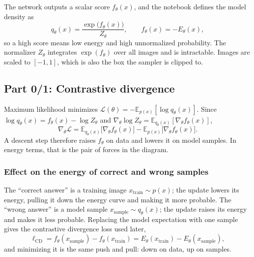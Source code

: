 The network outputs a scalar score \(f_\theta(x)\), and the notebook defines the model density as
\begin{equation}
  q_\theta(x) = \frac{\exp\bigl(f_\theta(x)\bigr)}{Z_\theta},
  \qquad
  f_\theta(x) = -E_\theta(x),
  \label{eq:ebm-q}
\end{equation}
so a high score means low energy and high unnormalized probability. The normalizer \(Z_\theta\) integrates \(\exp(f_\theta)\) over all images and is intractable. Images are scaled to \([-1,1]\), which is also the box the sampler is clipped to.

\subsection{Part 0/1: Contrastive divergence}

Maximum likelihood minimizes \(\mathcal{L}(\theta) = -\mathbb{E}_{p(x)}[\log q_\theta(x)]\). Since \(\log q_\theta(x) = f_\theta(x) - \log Z_\theta\) and \(\nabla_\theta \log Z_\theta = \mathbb{E}_{q_\theta(x)}[\nabla_\theta f_\theta(x)]\),
\begin{equation}
  \nabla_\theta \mathcal{L}
  = \mathbb{E}_{q_\theta(x)}\bigl[\nabla_\theta f_\theta(x)\bigr]
  - \mathbb{E}_{p(x)}\bigl[\nabla_\theta f_\theta(x)\bigr].
  \label{eq:cd-grad}
\end{equation}
A descent step therefore raises \(f_\theta\) on data and lowers it on model samples. In energy terms, that is the pair of forces in the diagram.

\subsubsection{Effect on the energy of correct and wrong samples}

The ``correct answer'' is a training image \(x_{\mathrm{train}} \sim p(x)\); the update lowers its energy, pulling it down the energy curve and making it more probable. The ``wrong answer'' is a model sample \(x_{\mathrm{sample}} \sim q_\theta(x)\); the update raises its energy and makes it less probable. Replacing the model expectation with one sample gives the contrastive divergence loss used later,
\begin{equation}
  \ell_{\mathrm{CD}} = f_\theta(x_{\mathrm{sample}}) - f_\theta(x_{\mathrm{train}})
  = E_\theta(x_{\mathrm{train}}) - E_\theta(x_{\mathrm{sample}}),
  \label{eq:cd-loss}
\end{equation}
and minimizing it is the same push and pull: down on data, up on samples.

